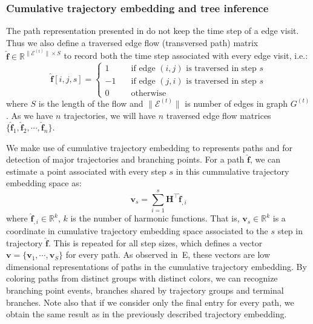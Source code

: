 \subsubsection{Cumulative trajectory embedding and tree inference}

The path representation presented in  do not keep the time step of a edge visit.  Thus we also define a traversed edge flow (transversed path) matrix $\hat{\mathbf{f}}\in \mathbb{R}^{{\|\mathcal{E}^{(t)}\|}\times S}$ to record both the time step associated with every edge visit, i.e.:
\begin{equation}
    \hat{\mathbf{f}}[i,j, s] = \begin{cases}
        1\quad & \text{if edge }(i,j) \text{ is traversed in step } s\\
        -1\quad & \text{if edge }(j,i) \text{ is traversed in step } s\\
        0 \quad & \text{otherwise}
    \end{cases}
\end{equation}
\noindent where $S$ is the length of the flow and $\|\mathcal{E}^{(t)}\|$ is number of edges in graph $G^{(t)}$. As we have $n$ trajectories, we will have $n$ traversed edge flow matrices $\{\hat{\mathbf{f}}_1, \hat{\mathbf{f}}_2,\cdots, \hat{\mathbf{f}}_n\}$.

We make use of cumulative trajectory embedding to represents paths and for detection of major trajectories and branching points. For a path $\hat{\mathbf{f}}$, we can estimate a point associated with every step $s$ in this cummulative trajectory embedding space as:
\begin{equation}
    \mathbf{v}_s =  \sum_{i = 1}^{s} \mathbf{H}^\top \hat{\mathbf{f}}_{,i}
\end{equation}
where $\hat{\mathbf{f}}_{,i}\in \mathbb{R}^k$, $k$ is the number of harmonic functions. That is,  $\mathbf{v}_s \in \mathbb{R}^k$ is a coordinate in cumulative trajectory embedding space associated to the $s$ step in trajectory $\hat{\mathbf{f}}$.  This is repeated for all step sizes, which defines a vector $\mathbf{v} = \{\mathbf{v}_1, \cdots,\mathbf{v}_S\}$ for every path. As observed in~E, these vectors are low dimensional representations of paths in the cumulative trajectory embedding. By coloring paths from distinct groups with distinct colors, we can recognize branching point events, branches shared by trajectory groups and terminal branches. Note also that if we consider only the final entry for every path, we obtain the same result as in the previously described trajectory embedding.


